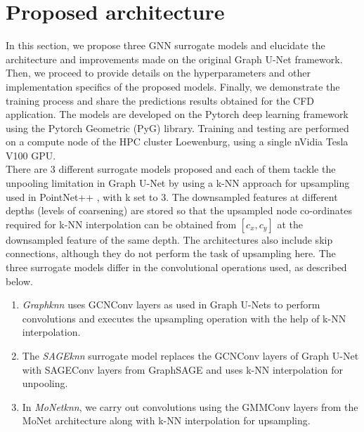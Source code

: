 \section{Proposed architecture}
\label{proparch}
In this section, we propose three GNN surrogate models and elucidate the architecture and improvements made on the original Graph U-Net framework. Then, we proceed to provide details on the hyperparameters and other implementation specifics of the proposed models. Finally, we demonstrate the training process and share the predictions results obtained for the CFD application. The models are developed on the Pytorch deep learning framework using the Pytorch Geometric (PyG) library. Training and testing are performed on a compute node of the \gls{HPC} cluster Loewenburg, using a single nVidia Tesla V100 GPU. \\
There are 3 different surrogate models proposed and each of them tackle the unpooling limitation in Graph U-Net by using a \gls{k-NN} approach for upsampling used in PointNet++ \cite{pnpp}, with k set to 3. The downsampled features at different depths (levels of coarsening) are stored so that the upsampled node co-ordinates required for k-NN interpolation can be obtained from $[c_{x}, c_{y}]$ at the downsampled feature of the same depth. The architectures also include skip connections, although they do not perform the task of upsampling here. The three surrogate models differ in the convolutional operations used, as described below. 
\begin{enumerate}
    \item \textit{Graphknn} uses GCNConv layers as used in Graph U-Nets to perform convolutions and executes the upsampling operation with the help of k-NN interpolation. 
    \item The \textit{SAGEknn} surrogate model replaces the GCNConv layers of Graph U-Net with SAGEConv layers from GraphSAGE \cite{SAGE} and uses k-NN interpolation for unpooling. 
    \item In \textit{MoNetknn}, we carry out convolutions using the GMMConv layers from the MoNet \cite{MoNet} architecture along with k-NN interpolation for upsampling. 

\end{enumerate}
